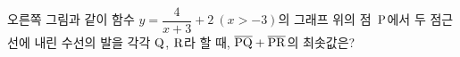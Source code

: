\noindent\begin{minipage}[t]{0.58\linewidth}\vspace{0pt}\raggedright 오른쪽 그림과 같이 함수 $y=\dfrac{4}{x+3}+2\ (x>-3)$의 그래프 위의 점~$\mathrm{P}$에서 두 점근선에 내린 수선의 발을 각각 $\mathrm{Q}$, $\mathrm{R}$라 할 때, $\overline{\mathrm{PQ}}+\overline{\mathrm{PR}}$의 최솟값은?\end{minipage}\hfill\begin{minipage}[t]{0.4\linewidth}\vspace{0pt}\centering \resizebox{\ifdim\width>\linewidth\linewidth\else\width\fi}{!}{}\end{minipage}\par
{}
